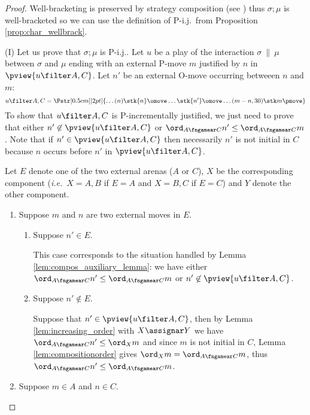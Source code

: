 \begin{proof}
Well-bracketing is preserved by strategy composition (see \cite[Proposition 2.5]{abramsky94full}) thus
$\sigma ; \mu$ is well-bracketed so we can use the definition of P-i.j.\ from Proposition \ref{prop:char_wellbrack}.

\noindent (I) Let us prove that $\sigma ; \mu$ is P-i.j..
Let $u$ be a play of the interaction $\sigma\ \|\ \mu$ between $\sigma$ and $\mu$
ending with an external P-move $m$
justified by $n$ in $\pview{u \filter A , C}$.
Let $n'$ be an external O-move occurring betweeen $n$ and $m$:
$$ u \filter A,C =
\Pstr[0.5cm][2pt]{ \ldots (n){\stk {n} \omove}  \ldots
 {\stk {n'} \omove}  \ldots  (m-n,30){\stk m \pmove}
}
$$
To show that $u \filter A,C$ is P-incrementally justified, we just need to prove that either $n'\not\in \pview{u \filter A,C}$ or $\ord_{A\fngamear C} n' \leq \ord_{A\fngamear C} m$.
Note that if $n'\in \pview{u \filter A,C}$
then necessarily $n'$ is not initial
in $C$ because $n$ occurs before $n'$ in
$\pview{u \filter A,C}$.

Let $E$ denote one of the two external arenas ($A$ or $C$), $X$ be
the corresponding component ({\it i.e.}~$X=A,B$ if $E=A$ and $X=B,C$
if $E=C$) and $Y$ denote the other component.
    \begin{enumerate}[1)]
    \item Suppose $m$ and $n$ are two external moves in $E$.

        \begin{enumerate}[{1}.a)]
        \item Suppose $n' \in E$.

        This case corresponds to the situation handled by Lemma \ref{lem:compos_auxiliary_lemma}: we have either $\ord_{A\fngamear C} n' \leq \ord_{A\fngamear C} m$
        or $n' \not\in \pview{u \filter A,C}$.

        \item Suppose $n' \not\in E$.

        Suppose that $n' \in \pview{u\filter A,C}$, then by
        Lemma \ref{lem:increasing_order} with $X\assignar Y$ we have $ \ord_{A\fngamear C} n'  \leq \ord_X m$
        and since $m$ is not initial in $C$, Lemma \ref{lem:compositionorder} gives $\ord_X m = \ord_{A\fngamear C} m$, thus $\ord_{A\fngamear C} n' \leq \ord_{A\fngamear C} m$.
        \end{enumerate}

        \item \label{case:mA} Suppose $m \in A$ and $n \in C$.


\end{enumerate}
\end{proof}
